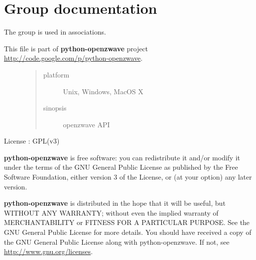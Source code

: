 \documentclass[letterpaper,10pt,english]{sphinxmanual}
\begin{document}
\section{Group documentation}
\label{group::doc}\label{group:group-documentation}
The group is used in associations.
\label{group:module-openzwave.group}\label{group:module-openzwave.group}\begin{description}
\item[{This file is part of \textbf{python-openzwave} project \href{http://code.google.com/p/python-openzwave}{http://code.google.com/p/python-openzwave}.}] \leavevmode\begin{quote}\begin{description}
\item[{platform}] \leavevmode
Unix, Windows, MacOS X

\item[{sinopsis}] \leavevmode
openzwave API

\end{description}\end{quote}

\end{description}

License : GPL(v3)

\textbf{python-openzwave} is free software: you can redistribute it and/or modify
it under the terms of the GNU General Public License as published by
the Free Software Foundation, either version 3 of the License, or
(at your option) any later version.

\textbf{python-openzwave} is distributed in the hope that it will be useful,
but WITHOUT ANY WARRANTY; without even the implied warranty of
MERCHANTABILITY or FITNESS FOR A PARTICULAR PURPOSE. See the
GNU General Public License for more details.
You should have received a copy of the GNU General Public License
along with python-openzwave. If not, see \href{http://www.gnu.org/licenses}{http://www.gnu.org/licenses}.
\end{document}
